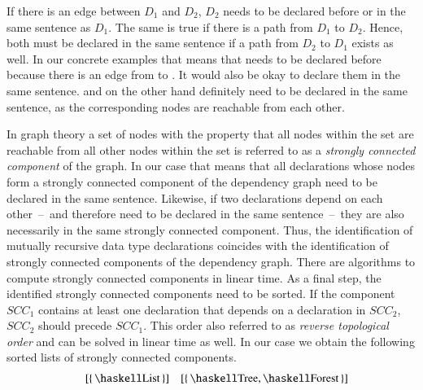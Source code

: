 If there is an edge between $D_1$ and $D_2$, $D_2$ needs to be declared before or in the same sentence as $D_1$.
The same is true if there is a path from $D_1$ to $D_2$.
Hence, both must be declared in the same sentence if a path from $D_2$ to $D_1$ exists as well.
In our concrete examples that means that  needs to be declared before  because there is an edge from  to .
It would also be okay to declare them in the same sentence.
 and  on the other hand definitely need to be declared in the same sentence, as the corresponding nodes are reachable from each other.

In graph theory a set of nodes with the property that all nodes within the set are reachable from all other nodes within the set is referred to as a \textit{strongly connected component} of the graph.
In our case that means that all declarations whose nodes form a strongly connected component of the dependency graph need to be declared in the same sentence.
Likewise, if two declarations depend on each other~--~and therefore need to be declared in the same sentence~--~they are also necessarily in the same strongly connected component.
Thus, the identification of mutually recursive data type declarations coincides with the identification of strongly connected components of the dependency graph.
There are algorithms to compute strongly connected components in linear time.
As a final step, the identified strongly connected components need to be sorted.
If the component $SCC_1$ contains at least one declaration that depends on a declaration in $SCC_2$, $SCC_2$ should precede $SCC_1$.
This order also referred to as \textit{reverse topological order} and can be solved in linear time as well.
In our case we obtain the following sorted lists of strongly connected components.
\begin{align*}
  [\{\, \haskellM{B} \,\}, \{\, \haskellM{A} \,\}]
  && [\{\, \haskellM{List} \,\}]
  && [\{\, \haskellM{Tree}, \haskellM{Forest} \,\}]
\end{align*}

